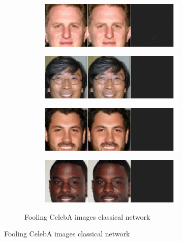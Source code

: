 \documentclass{article}
\begin{document}
\begin{figure}
\centering
\begin{subfigure}{1.\textwidth}
    \begin{subfigure}{.245\textwidth}
      \centering
      \includegraphics[width=1\linewidth]{img/fooling/AddingMoustache_52_Classic.png}
      \label{fig:AddingMoustache_52_Classical}
    \end{subfigure}%
    \begin{subfigure}{.245\textwidth}
      \centering
      \includegraphics[width=1\linewidth]{img/fooling/AddingMoustache_54_Classic.png}
      \label{fig:AddingMoustache_54_Classical}
    \end{subfigure}  
    \begin{subfigure}{.245\textwidth}
      \centering
      \includegraphics[width=1\linewidth]{img/fooling/remove_mustache_1489_Classic.png}
      \label{fig:remove_mustache_1489}
    \end{subfigure}  
    \begin{subfigure}{.245\textwidth}
      \centering
      \includegraphics[width=1\linewidth]{img/fooling/remove_mustache_6850_Classic.png}
      \label{fig:remove_mustache_6850}
    \end{subfigure}  
    \caption{Fooling CelebA images classical network}
\end{subfigure}  


\end{figure}
\end{document}
